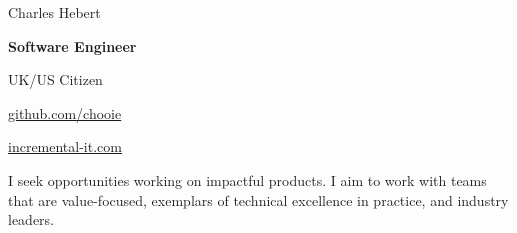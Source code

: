 \begin{center}
  {\Huge Charles Hebert}

  \vspace*{0.5em}

  \textbf{Software Engineer}

  UK/US Citizen
\end{center}

\begin{small}

\noindent
\begin{minipage}[t]{0.5\textwidth}
\end{minipage}
\noindent
\noindent
\begin{minipage}[t]{0.5\textwidth}
  \begin{description}
    \raggedleft
    \item[My code] \href{http://www.github.com/chooie}{github.com/chooie}
    \item[Website]
      \href{http://incremental-it.com}{incremental-it.com}
  \end{description}
\end{minipage}
\noindent

\end{small}

\vspace*{1em}
\begin{center}
  I seek opportunities working on impactful products. I aim to work with teams
  that are value-focused, exemplars of technical excellence in practice, and
  industry leaders.
\end{center}

